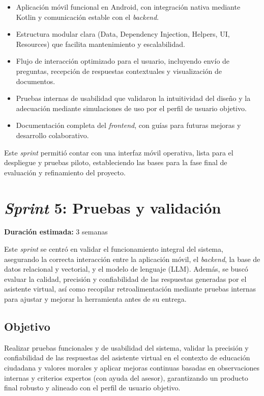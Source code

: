 \begin{itemize}
      \item Aplicación móvil funcional en Android, con integración nativa mediante Kotlin y
            comunicación estable con el \textit{backend}.
      \item Estructura modular clara (Data, Dependency Injection, Helpers, UI, Resources)
            que facilita mantenimiento y escalabilidad.
      \item Flujo de interacción optimizado para el usuario, incluyendo envío de preguntas,
            recepción de respuestas contextuales y visualización de documentos.
      \item Pruebas internas de usabilidad que validaron la intuitividad del diseño y la
            adecuación mediante simulaciones de uso por el perfil de usuario objetivo.
      \item Documentación completa del \textit{frontend}, con guías para futuras mejoras y
            desarrollo colaborativo.
\end{itemize}

Este \textit{sprint} permitió contar con una interfaz móvil operativa, lista
para el despliegue y pruebas piloto, estableciendo las bases para la fase final
de evaluación y refinamiento del proyecto.

\section{\textit{Sprint} 5: Pruebas y validación}
\textbf{Duración estimada:} 3 semanas

Este \textit{sprint} se centró en validar el funcionamiento integral del
sistema, asegurando la correcta interacción entre la aplicación móvil, el
\textit{backend}, la base de datos relacional y vectorial, y el modelo de
lenguaje (LLM). Además, se buscó evaluar la calidad, precisión y confiabilidad
de las respuestas generadas por el asistente virtual, así como recopilar
retroalimentación mediante pruebas internas para ajustar y mejorar la
herramienta antes de su entrega.

\subsection{Objetivo}
Realizar pruebas funcionales y de usabilidad del sistema, validar la precisión
y confiabilidad de las respuestas del asistente virtual en el contexto de
educación ciudadana y valores morales y aplicar mejoras continuas basadas en
observaciones internas y criterios expertos (con ayuda del asesor),
garantizando un producto final robusto y alineado con el perfil de usuario
objetivo.

